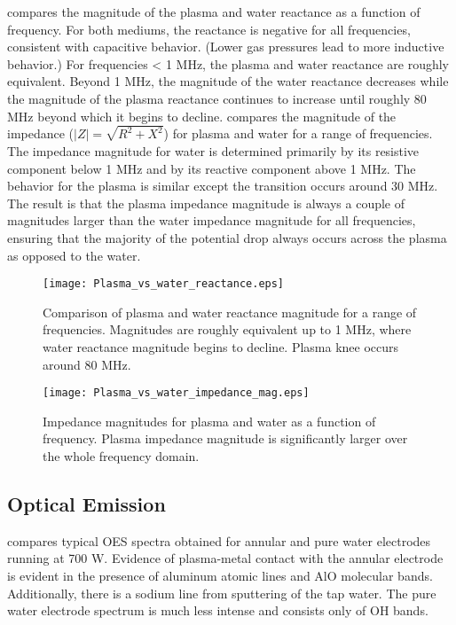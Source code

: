  compares the magnitude of the plasma and water reactance as a function of frequency. For both mediums, the reactance is negative for all frequencies, consistent with capacitive behavior. (Lower gas pressures lead to more inductive behavior.) For frequencies < 1 MHz, the plasma and water reactance are roughly equivalent. Beyond 1 MHz, the magnitude of the water reactance decreases while the magnitude of the plasma reactance continues to increase until roughly 80 MHz beyond which it begins to decline.  compares the magnitude of the impedance ($|Z| = \sqrt{R^2 + X^2}$) for plasma and water for a range of frequencies. The impedance magnitude for water is determined primarily by its resistive component below 1 MHz and by its reactive component above 1 MHz. The behavior for the plasma is similar except the transition occurs around 30 MHz. The result is that the plasma impedance magnitude is always a couple of magnitudes larger than the water impedance magnitude for all frequencies, ensuring that the majority of the potential drop always occurs across the plasma as opposed to the water.

\begin{figure}[htbp]
  \centering
  \texttt{[image: Plasma\_vs\_water\_reactance.eps]}
  \caption{Comparison of plasma and water reactance magnitude for a range of frequencies. Magnitudes are roughly equivalent up to 1 MHz, where water reactance magnitude begins to decline. Plasma knee occurs around 80 MHz.}
  \label{fig:react_compare}
\end{figure}

\begin{figure}[htbp]
  \centering
  \texttt{[image: Plasma\_vs\_water\_impedance\_mag.eps]}
  \caption{Impedance magnitudes for plasma and water as a function of frequency. Plasma impedance magnitude is significantly larger over the whole frequency domain.}
  \label{fig:imped_mag}
\end{figure}

\subsection{Optical Emission}
\label{sec:OES}

 compares typical OES spectra obtained for annular and pure water electrodes running at 700 W. Evidence of plasma-metal contact with the annular electrode is evident in the presence of aluminum atomic lines and AlO molecular bands. Additionally, there is a sodium line from sputtering of the tap water. The pure water electrode spectrum is much less intense and consists only of OH bands.

